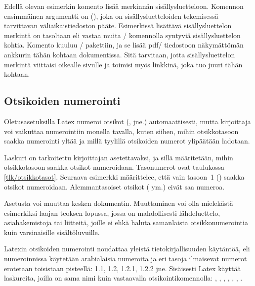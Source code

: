 \noindent
Edellä olevan esimerkin komento  lisää
merkinnän sisällysluetteloon. Komennon ensimmäinen argumentti on
 (), joka on sisällysluetteloiden
tekemisessä tarvittavan väliaikaistiedoston pääte. Esimerkissä lisättävä
sisällysluettelon merkintä on tasoltaan  eli vastaa muita
\-/ komennolla syntyviä sisällysluettelon kohtia.
Komento  kuuluu \-/
pakettiin, ja se lisää pdf\-/ tiedostoon näkymättömän ankkurin tähän
kohtaan dokumentissa. Sitä tarvitaan, jotta sisällysluettelon merkintä
viittaisi oikealle sivulle ja toimisi myös linkkinä, joka tuo juuri
tähän kohtaan.

\subsection{Otsikoiden numerointi}
\label{luku/otsikot-numerointi}

Oletusasetuksilla Latex numeroi otsikot (,
 jne.) automaattisesti, mutta kirjoittaja voi vaikuttaa
numerointiin monella tavalla, kuten siihen, mihin otsikkotasoon saakka
numerointi yltää ja millä tyylillä otsikoiden numerot ylipäätään
ladotaan.

Laskuri  on tarkoitettu kirjoittajan
asetettavaksi, ja sillä määritetään, mihin otsikkotasoon saakka otsikot
numeroidaan. Tasonumerot ovat taulukossa \ref{tlk/otsikkotasot}.
Seuraava esimerkki määrittelee, että vain tasoon~1 ()
saakka otsikot numeroidaan. Alemmantasoiset otsikot
( ym.) eivät saa numeroa.

\begin{koodilohkosis}
\setcounter{secnumdepth}{1}
\end{koodilohkosis}

\noindent
Asetusta voi muuttaa kesken dokumentin. Muuttaminen voi olla mielekästä
esimerkiksi laajan teoksen lopussa, jossa on mahdollisesti
lähdeluettelo, asiahakemistoja tai liitteitä, joille ei ehkä haluta
samanlaista otsikkonumerointia kuin varsinaisille sisältöluvuille.

Latexin otsikoiden numerointi noudattaa yleistä tietokirjallisuuden
käytäntöä, eli numeroinnissa käytetään arabialaisia numeroita ja eri
tasoja ilmaisevat numerot erotetaan toisistaan pisteellä: 1.1, 1.2,
1.2.1, 1.2.2 jne. Sisäisesti Latex käyttää laskureita, joilla on sama
nimi kuin vastaavalla otsikointikomennolla: ,
, , ,
, , .

